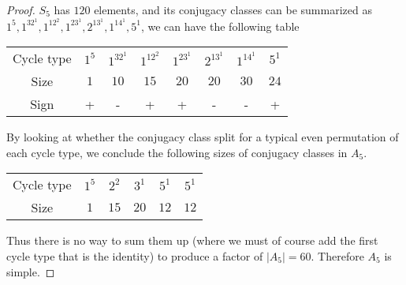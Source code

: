 \begin{proof}
    $S_5$ has $120$ elements, and its conjugacy classes can be summarized as $1^5,1^32^1,1^12^2,1^23^1,2^13^1,1^14^1,5^1$, we can have the following table
    \begin{center}
        \begin{tabular}{c|ccccccc}
            Cycle type&$1^5$&$1^32^1$&$1^12^2$&$1^23^1$&$2^13^1$&$1^14^1$&$5^1$\\
            Size&$1$&$10$&$15$&$20$&$20$&$30$&$24$\\
            Sign&+&-&+&+&-&-&+
        \end{tabular}
    \end{center}
    By looking at whether the conjugacy class split for a typical even permutation of each cycle type, we conclude the following sizes of conjugacy classes in $A_5$.
    \begin{center}
        \begin{tabular}{c|ccccc}
            Cycle type&$1^5$&$2^2$&$3^1$&$5^1$&$5^1$\\
            Size&$1$&$15$&$20$&$12$&$12$
        \end{tabular}
    \end{center}
    Thus there is no way to sum them up (where we must of course add the first cycle type that is the identity) to produce a factor of $|A_5|=60$.
    Therefore $A_5$ is simple.
\end{proof}